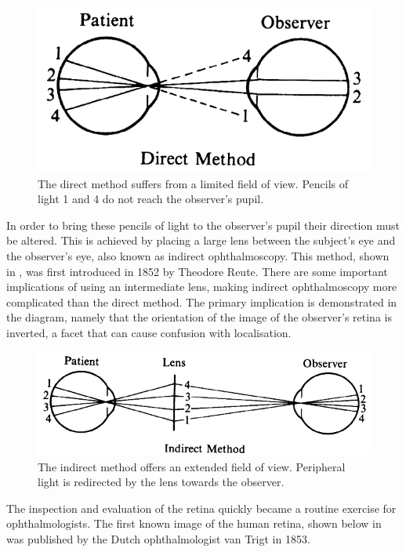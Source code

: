 \begin{figure}[H]
\centering
  \includegraphics{figures/indirect_opthal}
\caption{The direct method suffers from a limited field of view. Pencils of light 1 and 4 do not reach the observer's pupil.\cite{1_eyecalcs.com_2015}}
\label{fig:limited_direct}
\end{figure}


In order to bring these pencils of light to the observer's pupil their direction
must be altered.  This is achieved by placing a large lens between the subject's
eye and the observer's eye, also known as indirect ophthalmoscopy.  This
method, shown in , was first introduced in 1852 by
Theodore Reute.\cite{reutecgt}  There are some important implications of
using an intermediate lens, making indirect ophthalmoscopy more complicated
than the direct method.  The primary implication is demonstrated in the diagram,
namely that the orientation of the image of the observer's retina is inverted, a
facet that can cause confusion with localisation.  

\begin{figure}[H]
\centering
  \includegraphics{figures/indirect_opthal2}
\caption{The indirect method offers an extended field of view.  Peripheral light is redirected by the lens towards the observer.\cite{1_eyecalcs.com_2015}}
\label{fig:indirect_main}
\end{figure}

The inspection and evaluation of the retina quickly became a routine exercise
for ophthalmologists.  The first known image of the human retina, shown below
 in  was published by the Dutch ophthalmologist van Trigt
in 1853.\cite{kjerrumgaard1948retinitis,van1853dissertatio}  

